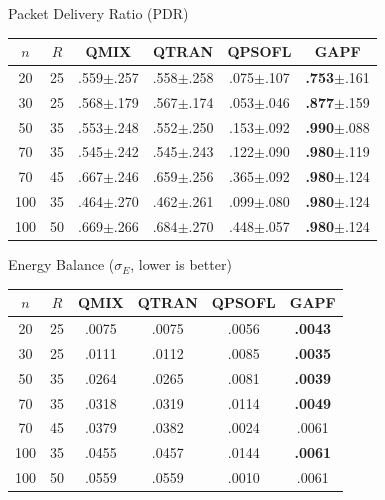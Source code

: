 \documentclass[final]{beamer}
\newlength{\colwidth}
\begin{document}
\begin{frame}[t]
\begin{columns}[t]
\begin{column}{\colwidth}
  \begin{block}{Packet Delivery Ratio (PDR)}
    \footnotesize
    \begin{table}
      \centering
      \begin{tabular}{cc|cccc}
        \toprule
        $n$ & $R$ & QMIX & QTRAN & QPSOFL & \textbf{GAPF} \\
        \midrule
        20  & 25 & .559{\scriptsize$\pm$.257} & .558{\scriptsize$\pm$.258} & .075{\scriptsize$\pm$.107} & \textbf{.753}{\scriptsize$\pm$.161} \\
        30  & 25 & .568{\scriptsize$\pm$.179} & .567{\scriptsize$\pm$.174} & .053{\scriptsize$\pm$.046} & \textbf{.877}{\scriptsize$\pm$.159} \\
        50  & 35 & .553{\scriptsize$\pm$.248} & .552{\scriptsize$\pm$.250} & .153{\scriptsize$\pm$.092} & \textbf{.990}{\scriptsize$\pm$.088} \\
        70  & 35 & .545{\scriptsize$\pm$.242} & .545{\scriptsize$\pm$.243} & .122{\scriptsize$\pm$.090} & \textbf{.980}{\scriptsize$\pm$.119} \\
        70  & 45 & .667{\scriptsize$\pm$.246} & .659{\scriptsize$\pm$.256} & .365{\scriptsize$\pm$.092} & \textbf{.980}{\scriptsize$\pm$.124} \\
        100 & 35 & .464{\scriptsize$\pm$.270} & .462{\scriptsize$\pm$.261} & .099{\scriptsize$\pm$.080} & \textbf{.980}{\scriptsize$\pm$.124} \\
        100 & 50 & .669{\scriptsize$\pm$.266} & .684{\scriptsize$\pm$.270} & .448{\scriptsize$\pm$.057} & \textbf{.980}{\scriptsize$\pm$.124} \\
        \bottomrule
      \end{tabular}
    \end{table}
  \end{block}

  \begin{block}{Energy Balance ($\sigma_E$, lower is better)}
    \footnotesize
    \begin{table}
      \centering
      \begin{tabular}{cc|cccc}
        \toprule
        $n$ & $R$ & QMIX & QTRAN & QPSOFL & \textbf{GAPF} \\
        \midrule
        20  & 25 & .0075 & .0075 & .0056 & \textbf{.0043} \\
        30  & 25 & .0111 & .0112 & .0085 & \textbf{.0035} \\
        50  & 35 & .0264 & .0265 & .0081 & \textbf{.0039} \\
        70  & 35 & .0318 & .0319 & .0114 & \textbf{.0049} \\
        70  & 45 & .0379 & .0382 & .0024 & .0061 \\
        100 & 35 & .0455 & .0457 & .0144 & \textbf{.0061} \\
        100 & 50 & .0559 & .0559 & .0010 & .0061 \\
        \bottomrule
      \end{tabular}
    \end{table}
  \end{block}


\end{column}
\end{columns}
\end{frame}
\end{document}
